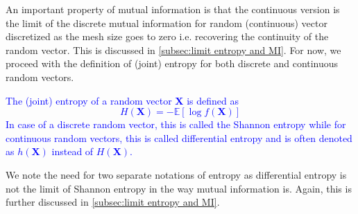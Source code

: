 \documentclass[../Thesis.tex]{subfiles}
\begin{document}
An important property of mutual information is that the continuous version is the limit of the discrete mutual information for random (continuous) vector discretized as the mesh size goes to zero i.e. recovering the continuity of the random vector. This is discussed in \autoref{subsec:limit entropy and MI}. For now, we proceed with the definition of (joint) entropy for both discrete and continuous random vectors.
\textcolor{blue}{
    \begin{definition}[Entropy]\label{def:entropy}
        The (joint) entropy of a random vector $\boldsymbol{X}$ is defined as
        $$H\left(\boldsymbol{X}\right) = - \mathbb{E}\left[\log f(\boldsymbol X)\right]$$
        In case of a discrete random vector, this is called the Shannon entropy while for continuous random vectors, this is called differential entropy and is often denoted as $h\left(\boldsymbol X\right)$ instead of $H\left(\boldsymbol X\right)$.
    \end{definition}
}
We note the need for two separate notations of entropy as differential entropy is not the limit of Shannon entropy in the way mutual information is. Again, this is further discussed in \autoref{subsec:limit entropy and MI}.
\end{document}
